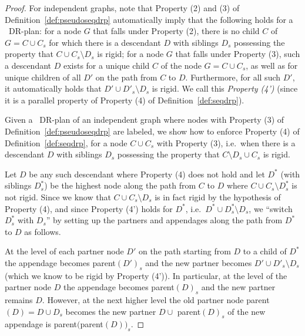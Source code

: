 \begin{proof}
    For independent graphs, note that Property (2) and (3) of Definition~\ref{def:pseudoseqdrp} automatically imply that the following holds for a \pseudosequential\ DR-plan: for a node $G$ that falls under Property (2), there is no child $C$ of $G = C\cup C_s$ for which there is a descendant $D$ with siblings $D_s$ possessing the property that $C\cup C_s \setminus D_s$ is rigid; for a node $G$ that falls under Property (3), such a descendant $D$ exists for a unique child $C$ of the node $G=C\cup C_s$, as well as for unique children of all $D'$ on the path from $C$ to $D$. Furthermore, for all such $D'$, it automatically holds that $D'\cup D'_s \setminus D_s$ is rigid. We call this \emph{Property (4')} (since it is a parallel property of Property (4) of Definition~\ref{def:seqdrp}).

    Given a \pseudosequential\ DR-plan of an independent graph where nodes with Property (3) of Definition~\ref{def:pseudoseqdrp} are labeled, we show how to enforce Property (4) of Definition~\ref{def:seqdrp}, for a node $C\cup C_s$ with Property (3), i.e.\ when there is a descendant $D$ with siblings $D_s$ possessing the property that $C\setminus D_s \cup C_s$ is rigid.

    Let $D$ be any such descendant where Property (4) does not hold and let $D^*$ (with siblings $D^*_s$) be the highest node along the path from $C$ to $D$ where $C\cup C_s \setminus D^*_s$ is not rigid.
    Since we know that $C\cup C_s \setminus D_s$ is in fact rigid by the hypothesis of Property (4), and since Property (4') holds for $D^*$, i.e.\ $D^*\cup D^*_s \setminus D_s$, we ``switch $D^*_s$ with $D_s$'' by setting up the partners and appendages along the path from $D^*$ to $D$ as follows.

    At the level of each partner node $D'$ on the path starting from $D$ to a child of $D^*$ the appendage becomes parent$(D')_s$ and the new partner becomes $D'\cup D'_s\setminus D_s$ (which we know to be rigid by Property (4')). In particular, at the level of the partner node $D$ the appendage becomes parent$(D)_s$ and the new partner remains $D$. However, at the next higher level the old partner node parent$(D) = D\cup D_s$ becomes the new partner $D\cup$ parent$(D)_s$ of the new appendage is parent$($parent$(D))_s$.


\end{proof}
